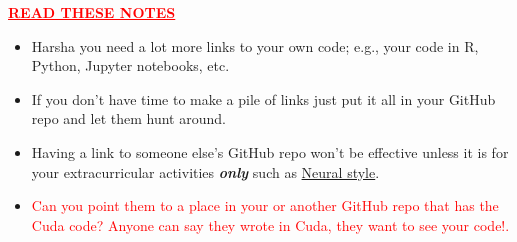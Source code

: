 \documentclass[11pt]{ltxdoc}
\begin{document}
\begin{center}
	\textbf{\textcolor{red}{\underline{READ THESE NOTES}}}
\end{center}

  \begin{itemize}
  	
  	\item Harsha you need a lot more links to your own code; e.g., your code in R, Python, Jupyter notebooks, etc.
  	
  	\item If you don't have time to make a pile of links just put it all in your GitHub repo and let  
  	    them hunt around. 
  	    
	\item Having a link to someone else's GitHub repo won't be effective unless it is for your 
	    extracurricular activities \textbf{\textit{only}} such as \href{https://github.com/jcjohnson/neural-style}{Neural style}.
	
	\item \textcolor{red}{Can you point them to a place in your or another GitHub repo that has the   
		Cuda code?
        Anyone can say they wrote in Cuda, they want to see your code!.}
  
\end{itemize}
\end{document}
